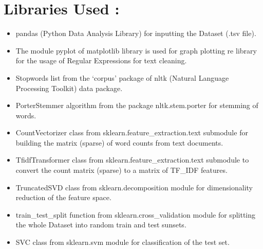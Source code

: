 \documentclass{report}
\begin{document}
\section{\huge Libraries Used :}
\begin{itemize}
\item pandas (Python Data Analysis Library) for inputting the Dataset (.tsv file).

\item The module pyplot of matplotlib library is used for graph plotting
re library for the usage of Regular Expressions for text cleaning.

\item Stopwords list from the ‘corpus’ package of nltk (Natural Language Processing Toolkit) data package.

\item PorterStemmer algorithm from the package nltk.stem.porter for stemming of words.

\item CountVectorizer class from sklearn.feature\_extraction.text submodule for building the matrix (sparse) of word counts from text documents.

\item TfidfTransformer class from sklearn.feature\_extraction.text submodule to convert the count matrix (sparse) to a matrix of TF\_IDF features.

\item TruncatedSVD class from sklearn.decomposition module for dimensionality reduction of the feature space.

\item train\_test\_split function from sklearn.cross\_validation module for splitting the whole Dataset into random train and test sunsets.

\item SVC class from sklearn.svm module for classification of the test set.
\end{itemize}



\end{document}
